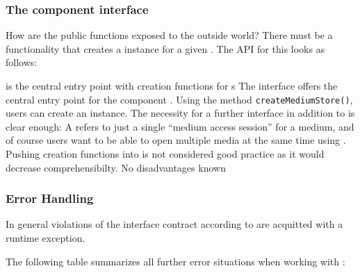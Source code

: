 
\subsubsection{The component interface}
\label{sec:ErrorConditionsSS}

How are the public functions exposed to the outside world? There must be a functionality that creates a \IMediumStore{} instance for a given \IMedium{}. The API for this looks as follows:

{%
\IMediaAPI{} is the central entry point with creation functions for \IMediumStore{}s
}
{%
The interface \IMediaAPI{} offers the central entry point for the component \COMPmedia{}. Using the method \texttt{createMediumStore()}, users can create an \IMediumStore{} instance.
}
{%
The necessity for a further interface in addition to \IMediumStore{} is clear enough: A \IMediumStore{} refers to just a single ``medium access session'' for a medium, and of course users want to be able to open multiple media at the same time using \COMPmedia{}. Pushing creation functions into \IMediumStore{} is not considered good practice as it would decrease comprehensibilty.
}
{%
No disadvantages known
}


\subsubsection{Error Handling}
\label{sec:ErrorConditions}

In general violations of the interface contract according to  are acquitted with a runtime exception.

The following table summarizes all further error situations when working with \COMPmedia{}:


